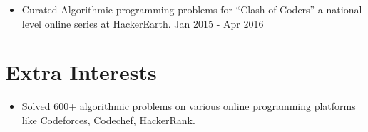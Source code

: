 \documentclass{res}
\begin{document}
\begin{resume}
\begin{itemize} \vspace{8pt}
\item Curated Algorithmic programming problems for ``Clash of Coders'' a national level online series at HackerEarth. \hfill Jan 2015 - Apr 2016
\end{itemize}

\vspace{0.01in} 
\section{{\Large Extra Interests}} 
\vspace{8pt}

\begin{itemize} \vspace{8pt}
\item Solved 600+ algorithmic problems on various online programming platforms like Codeforces, Codechef, HackerRank.
\end{itemize}


 
\end{resume} 
\end{document}
